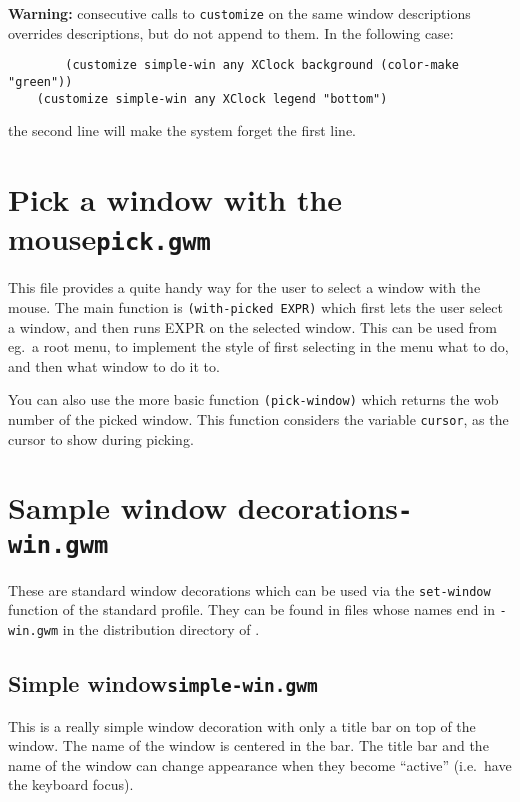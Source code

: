 {\bf Warning:} consecutive calls to \verb|customize| on the same
window descriptions
overrides descriptions, but do not append to them. In the following case:
{\exemplefont\begin{verbatim}
        (customize simple-win any XClock background (color-make "green"))
	(customize simple-win any XClock legend "bottom")
\end{verbatim}}
the second line will make the system forget the first line.

\section{Pick a window with the mouse\hfill{\tt pick.gwm}}

This file provides a quite handy way for the user to select a window
with the mouse. The main function is {\tt (with-picked EXPR)} which first
lets the user select a window, and then runs EXPR on the selected
window. This can be used from eg.\ a root menu, to implement the style
of first selecting in the menu what to do, and then what window to do
it to. 

You can also use the more basic function {\tt (pick-window)} which
returns the wob number of the picked window. This function considers
the variable {\tt cursor}, as the cursor to show during picking.

\section{Sample window decorations\hfill{\tt *-win.gwm}}
\label{standard-decorations}

These are standard window decorations which can be used via the
\verb"set-window" function of the standard profile. They can be found in
files whose names end in {\tt -win.gwm} in the distribution directory of
{\GWM}.

\subsection{Simple window\hfill{\tt simple-win.gwm}}
\label{simple-win}

\centerline{}

This is a really simple window decoration with only a title bar on top of
the window. The name of the window is centered in the bar. The title bar and
the name of the window can change appearance when they become ``active'' (i.e.\ 
have the keyboard focus).

